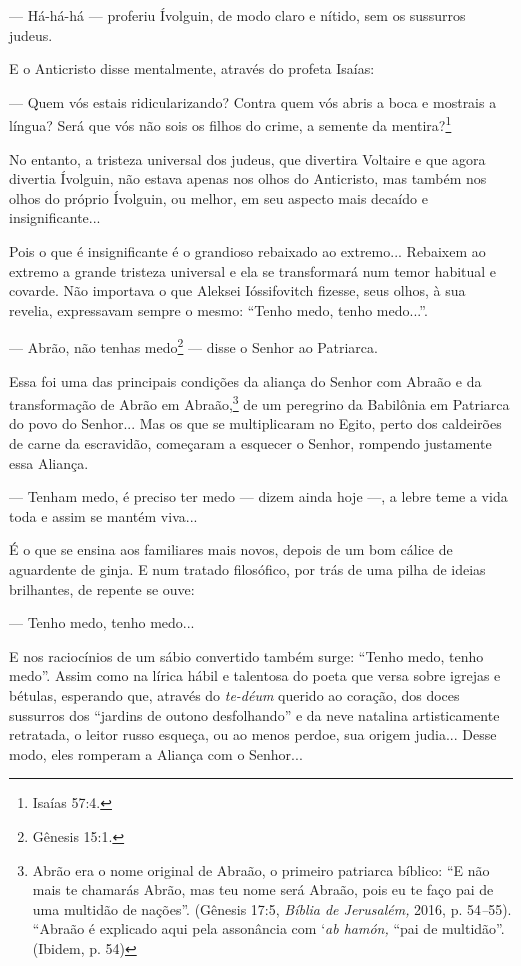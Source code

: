 --- Há-há-há --- proferiu Ívolguin, de modo claro e nítido, sem os
sussurros judeus.

E o Anticristo disse mentalmente, através do profeta Isaías:

--- Quem vós estais ridicularizando? Contra quem vós abris a boca e
mostrais a língua? Será que vós não sois os filhos do crime, a semente
da mentira?\footnote{Isaías 57:4.}

No entanto, a tristeza universal dos judeus, que divertira Voltaire e
que agora divertia Ívolguin, não estava apenas nos olhos do Anticristo,
mas também nos olhos do próprio Ívolguin, ou melhor, em seu aspecto mais
decaído e insignificante...

Pois o que é insignificante é o grandioso rebaixado ao extremo...
Rebaixem ao extremo a grande tristeza universal e ela se transformará
num temor habitual e covarde. Não importava o que Aleksei Ióssifovitch
fizesse, seus olhos, à sua revelia, expressavam sempre o mesmo: ``Tenho
medo, tenho medo...''.

--- Abrão, não tenhas medo\footnote{Gênesis 15:1.} --- disse o Senhor ao
Patriarca.

Essa foi uma das principais condições da aliança do Senhor com Abraão e
da transformação de Abrão em Abraão,\footnote{Abrão era o nome original
  de Abraão, o primeiro patriarca bíblico: ``E não mais te chamarás
  Abrão, mas teu nome será Abraão, pois eu te faço pai de uma multidão
  de nações''. (Gênesis 17:5, \emph{Bíblia de Jerusalém,} 2016, p.
  54\emph{--}55). ``Abraão é explicado aqui pela assonância com
  `\emph{ab hamón,} ``pai de multidão''. (Ibidem, p. 54)} de um
peregrino da Babilônia em Patriarca do povo do Senhor... Mas os que se
multiplicaram no Egito, perto dos caldeirões de carne da escravidão,
começaram a esquecer o Senhor, rompendo justamente essa Aliança.

--- Tenham medo, é preciso ter medo --- dizem ainda hoje ---, a lebre
teme a vida toda e assim se mantém viva...

É o que se ensina aos familiares mais novos, depois de um bom cálice de
aguardente de ginja. E num tratado filosófico, por trás de uma pilha de
ideias brilhantes, de repente se ouve:

--- Tenho medo, tenho medo...

E nos raciocínios de um sábio convertido também surge: ``Tenho medo,
tenho medo''. Assim como na lírica hábil e talentosa do poeta que versa
sobre igrejas e bétulas, esperando que, através do \emph{te-déum}
querido ao coração, dos doces sussurros dos ``jardins de outono
desfolhando'' e da neve natalina artisticamente retratada, o leitor
russo esqueça, ou ao menos perdoe, sua origem judia... Desse modo, eles
romperam a Aliança com o Senhor...

